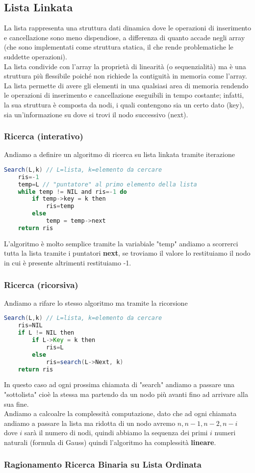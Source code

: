 \subsection{Lista Linkata}
La lista rappresenta una struttura dati dinamica dove le operazioni di inserimento e cancellazione sono meno dispendiose, a differenza di quanto accade negli array (che sono implementati come struttura statica, il che rende problematiche le suddette operazioni).\\
La lista condivide con l’array la proprietà di linearità (o sequenzialità) ma è una struttura più flessibile poiché non richiede la contiguità in memoria come l’array. La lista permette di avere gli elementi in una qualsiasi area di memoria rendendo le operazioni di inserimento e cancellazione eseguibili in tempo costante; infatti, la sua struttura è composta da nodi, i quali contengono sia un certo dato (key), sia un’informazione su dove si trovi il nodo successivo (next).

\subsubsection{Ricerca (interativo)}
Andiamo a definire un algoritmo di ricerca su lista linkata tramite iterazione
\begin{lstlisting}[language=Java]
Search(L,k) // L=lista, k=elemento da cercare
	ris=-1
	temp=L // "puntatore" al primo elemento della lista
	while temp != NIL and ris=-1 do
		if temp->key = k then
			ris=temp
		else
			temp = temp->next
	return ris
\end{lstlisting}
L'algoritmo è molto semplice tramite la variabiale "temp" andiamo a scorrerci tutta la lista tramite i puntatori \textbf{next}, se troviamo il valore lo restituiamo il nodo in cui è presente altrimenti restituiamo -1.

\subsubsection{Ricerca (ricorsiva)}
Andiamo a rifare lo stesso algoritmo ma tramite la ricorsione
\begin{lstlisting}[language=Java]
Search(L,k) // L=lista, k=elemento da cercare
	ris=NIL
	if L != NIL then
		if L->Key = k then
			ris=L
		else
			ris=search(L->Next, k)
	return ris
\end{lstlisting}
In questo caso ad ogni prossima chiamata di "search" andiamo a passare una "sottolista" cioè la stessa ma partendo da un nodo più avanti fino ad arrivare alla sua fine.\\
Andiamo a calcoalre la complessità computazione, dato che ad ogni chiamata andiamo a passare la lista ma ridotta di un nodo avremo $n, n-1, n-2, n-i$ dove $i$ sarà il numero di nodi, quindi abbiamo la sequenza dei primi $i$ numeri naturali (formula di Gauss) quindi l'algoritmo ha complessità \textbf{lineare}.
\subsubsection{Ragionamento Ricerca Binaria su Lista Ordinata}
\blindtext